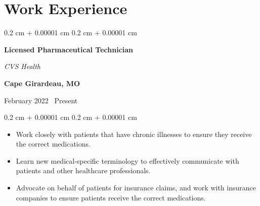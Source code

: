 \documentclass[10pt, letterpaper]{article}
\newenvironment{highlights}{
    \begin{itemize}[
        topsep=0.10 cm,
        parsep=0.10 cm,
        partopsep=0pt,
        itemsep=0pt,
        leftmargin=0.4 cm + 10pt
    ]
}{
    \end{itemize}
} %
\newenvironment{onecolentry}{
    \begin{adjustwidth}{
        0.2 cm + 0.00001 cm
    }{
        0.2 cm + 0.00001 cm
    }
}{
    \end{adjustwidth}
} %
\newenvironment{twocolentry}[2][]{
    \onecolentry
    \def\secondColumn{#2}
    \setcolumnwidth{\fill, 4.5 cm}
    \begin{paracol}{2}
}{
    \switchcolumn \raggedleft \secondColumn
    \end{paracol}
    \endonecolentry
} %
\begin{document}




\section{Work Experience}

\begin{samepage}

    \begin{twocolentry}{
            \textbf{Cape Girardeau, MO}

            February 2022 \textendash\ Present}
        \textbf{Licensed Pharmaceutical Technician}

        \textit{CVS Health}
    \end{twocolentry}

    \vspace{0.10 cm}
    \begin{onecolentry}
        \begin{highlights}
            \item Work closely with patients that have chronic illnesses to ensure they receive the correct medications.
            \item Learn new medical-specific terminology to effectively communicate with patients and other healthcare professionals.
            \item Advocate on behalf of patients for insurance claims, and work with insurance companies to ensure patients receive the correct medications.
        \end{highlights}
    \end{onecolentry}
\end{samepage}
\end{document}
